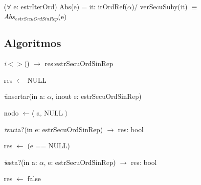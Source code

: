 \vspace{22pt}

\vspace{11pt}
($\forall$ e: estrIterOrd) Abs(e) = it: itOrdRef($\alpha$)/ verSecuSuby(it) $\equiv$ $Abs_{estrSecuOrdSinRep}$(e)

\vspace{33pt}


\subsection*{Algoritmos}

\textit{i}$<>$() $\longrightarrow$ res:estrSecuOrdSinRep\\
\begin{algorithm}[H]
res $\leftarrow$ NULL
\end{algorithm}

\textit{i}insertar(in a: $\alpha$, inout e: estrSecuOrdSinRep)\\
\begin{algorithm}[H]
nodo $\leftarrow \langle$ a, NULL $\rangle$
\BlankLine
{}
\end{algorithm}

\textit{i}vacia?(in e: estrSecuOrdSinRep) $\longrightarrow$ res: bool\\
\begin{algorithm}[H]
res $\leftarrow$ (e == NULL)
\end{algorithm}

\textit{i}esta?(in a: $\alpha$, e: estrSecuOrdSinRep) $\longrightarrow$ res: bool\\
\begin{algorithm}[H]
res $\leftarrow$ false\\
\BlankLine
{}
\end{algorithm}

